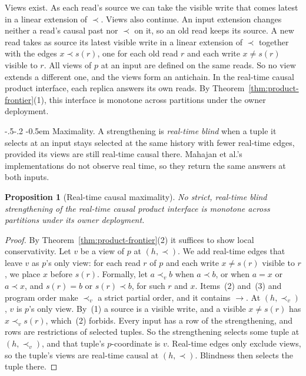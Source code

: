 \documentclass[sigconf]{cidr-2027}
\makeatletter
\newtheorem{proposition}{Proposition}
\theoremstyle{remark}
\renewcommand\paragraph{\@startsection{paragraph}{4}{\z@}%
  {-.5\baselineskip \@plus -2\p@ \@minus -.2\p@}%
  {-0.5em}%
  {\normalfont\bfseries}}
\newcommand{\indesc}{input extension\xspace} %
\makeatother
\begin{document}
Views exist. As each read's source we can take the visible write that comes
latest in a linear extension of $\prec$. Views also continue. An \indesc
changes neither a read's causal past nor $\prec$ on it, so an old read keeps
its source. A new read takes as source its latest visible write in a linear
extension of $\prec$ together with the edges $x\prec s(r)$, one for each old
read $r$ and each write $x\ne s(r)$ visible to $r$. All views of $p$ at an
input are defined on the same reads. So no view extends a different one, and
the views form an antichain. In the real-time causal product interface, each
replica answers its own reads. By Theorem~\ref{thm:product-frontier}(1), this
interface is monotone across partitions under the owner deployment.

\paragraph{Maximality.}
A strengthening is \emph{real-time blind} when a tuple it selects at an input
stays selected at the same history with fewer real-time edges, provided its
views are still real-time causal there. Mahajan et al.'s implementations do
not observe real time, so they return the same answers at both inputs.

\begin{proposition}[Real-time causal maximality]
\label{prop:rtc-maximal}
No strict, real-time blind strengthening of the real-time causal product
interface is monotone across partitions under its owner deployment.
\end{proposition}

\begin{proof}
By Theorem~\ref{thm:product-frontier}(2) it suffices to show local
conservativity. Let $v$ be a view of $p$ at $(h,\prec)$. We add real-time
edges that leave $v$ as $p$'s only view: for each read $r$ of $p$ and each
write $x\ne s(r)$ visible to $r$, we place $x$ before $s(r)$. Formally, let
$a\prec_v b$ when $a\prec b$, or when $a=x$ or $a\prec x$, and $s(r)=b$ or
$s(r)\prec b$, for such $r$ and $x$. Items~(2) and~(3) and program order make
$\prec_v$ a strict partial order, and it contains $\to$. At $(h,\prec_v)$,
$v$ is $p$'s only view. By~(1) a source is a visible write, and a visible
$x\ne s(r)$ has $x\prec_v s(r)$, which~(2) forbids. Every input has a row of
the strengthening, and rows are restrictions of selected tuples. So the
strengthening selects some tuple at $(h,\prec_v)$, and that tuple's
$p$-coordinate is $v$. Real-time edges only exclude views, so the tuple's
views are real-time causal at $(h,\prec)$. Blindness then selects the tuple
there.
\end{proof}
\end{document}
